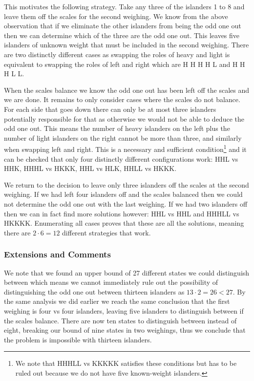 This motivates the following strategy. Take any three of the islanders 1 to 8 and leave them off the scales for the second weighing. We know from the above observation that if we eliminate the other islanders from being the odd one out then we can determine which of the three are the odd one out. This leaves five islanders of unknown weight that must be included in the second weighing. There are two distinctly different cases as swapping the roles of heavy and light is equivalent to swapping the roles of left and right which are H H H H L and H H H L L.

When the scales balance we know the odd one out has been left off the scales and we are done. It remains to only consider cases where the scales do not balance. For each side that goes down there can only be at most three islanders potentially responsible for that as otherwise we would not be able to deduce the odd one out. This means the number of heavy islanders on the left plus the number of light islanders on the right cannot be more than three, and similarly when swapping left and right. This is a necessary and sufficient condition\footnote{We note that HHHLL vs KKKKK satisfies these conditions but has to be ruled out because we do not have five known-weight islanders.} and it can be checked that only four distinctly different configurations work: HHL vs HHK, HHHL vs HKKK, HHL vs HLK, HHLL vs HKKK.

We return to the decision to leave only three islanders off the scales at the second weighing. If we had left four islanders off and the scales balanced then we could not determine the odd one out with the last weighing. If we had two islanders off then we can in fact find more solutions however: HHL vs HHL and HHHLL vs HKKKK. Enumerating all cases proves that these are all the solutions, meaning there are $2 \cdot 6 = 12$ different strategies that work.

\subsubsection{Extensions and Comments}

We note that we found an upper bound of 27 different states we could distinguish between which means we cannot immediately rule out the possibility of distinguishing the odd one out between thirteen islanders as $13 \cdot 2 = 26 < 27$. By the same analysis we did earlier we reach the same conclusion that the first weighing is four vs four islanders, leaving five islanders to distinguish between if the scales balance. There are now ten states to distinguish between instead of eight, breaking our bound of nine states in two weighings, thus we conclude that the problem is impossible with thirteen islanders.